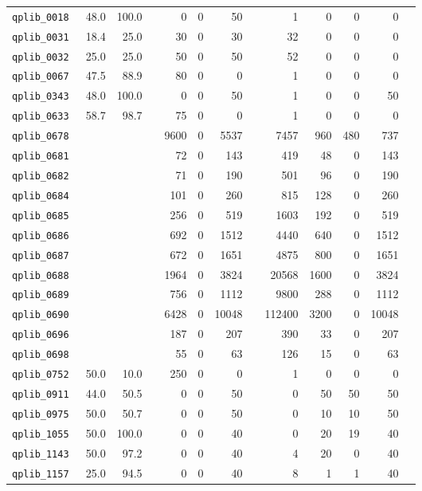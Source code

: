 {\begin{longtable}{lrrrrrrrrrrrr}
{\tt 	qplib\_0018	}	&	48.0	&	100.0	&	&	0	&	0	&	50	&	&	1	&	0	&	0	&	0	\\
{\tt 	qplib\_0031	}	&	18.4	&	25.0	&	&	30	&	0	&	30	&	&	32	&	0	&	0	&	0	\\
{\tt 	qplib\_0032	}	&	25.0	&	25.0	&	&	50	&	0	&	50	&	&	52	&	0	&	0	&	0	\\
{\tt 	qplib\_0067	}	&	47.5	&	88.9	&	&	80	&	0	&	0	&	&	1	&	0	&	0	&	0	\\
{\tt 	qplib\_0343	}	&	48.0	&	100.0	&	&	0	&	0	&	50	&	&	1	&	0	&	0	&	50	\\
{\tt 	qplib\_0633	}	&	58.7	&	98.7	&	&	75	&	0	&	0	&	&	1	&	0	&	0	&	0	\\
{\tt 	qplib\_0678	}	&		&		&	&	9600	&	0	&	5537	&	&	7457	&	960	&	480	&	737	\\
{\tt 	qplib\_0681	}	&		&		&	&	72	&	0	&	143	&	&	419	&	48	&	0	&	143	\\
{\tt 	qplib\_0682	}	&		&		&	&	71	&	0	&	190	&	&	501	&	96	&	0	&	190	\\
{\tt 	qplib\_0684	}	&		&		&	&	101	&	0	&	260	&	&	815	&	128	&	0	&	260	\\
{\tt 	qplib\_0685	}	&		&		&	&	256	&	0	&	519	&	&	1603	&	192	&	0	&	519	\\
{\tt 	qplib\_0686	}	&		&		&	&	692	&	0	&	1512	&	&	4440	&	640	&	0	&	1512	\\
{\tt 	qplib\_0687	}	&		&		&	&	672	&	0	&	1651	&	&	4875	&	800	&	0	&	1651	\\
{\tt 	qplib\_0688	}	&		&		&	&	1964	&	0	&	3824	&	&	20568	&	1600	&	0	&	3824	\\
{\tt 	qplib\_0689	}	&		&		&	&	756	&	0	&	1112	&	&	9800	&	288	&	0	&	1112	\\
{\tt 	qplib\_0690	}	&		&		&	&	6428	&	0	&	10048	&	&	112400	&	3200	&	0	&	10048	\\
{\tt 	qplib\_0696	}	&		&		&	&	187	&	0	&	207	&	&	390	&	33	&	0	&	207	\\
{\tt 	qplib\_0698	}	&		&		&	&	55	&	0	&	63	&	&	126	&	15	&	0	&	63	\\
{\tt 	qplib\_0752	}	&	50.0	&	10.0	&	&	250	&	0	&	0	&	&	1	&	0	&	0	&	0	\\
{\tt 	qplib\_0911	}	&	44.0	&	50.5	&	&	0	&	0	&	50	&	&	0	&	50	&	50	&	50	\\
{\tt 	qplib\_0975	}	&	50.0	&	50.7	&	&	0	&	0	&	50	&	&	0	&	10	&	10	&	50	\\
{\tt 	qplib\_1055	}	&	50.0	&	100.0	&	&	0	&	0	&	40	&	&	0	&	20	&	19	&	40	\\
{\tt 	qplib\_1143	}	&	50.0	&	97.2	&	&	0	&	0	&	40	&	&	4	&	20	&	0	&	40	\\
{\tt 	qplib\_1157	}	&	25.0	&	94.5	&	&	0	&	0	&	40	&	&	8	&	1	&	1	&	40	\\

\end{longtable}}
